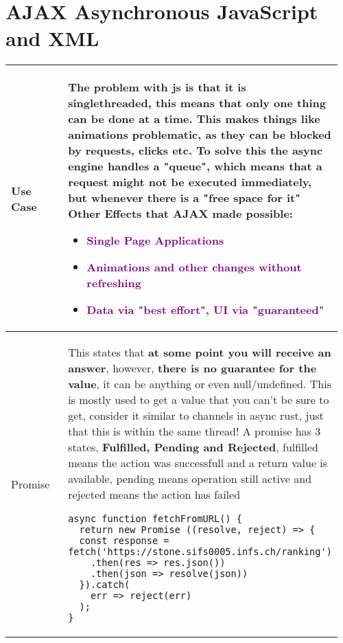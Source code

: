 \documentclass[main.tex,fontsize=8pt,paper=a4,paper=portrait,DIV=calc,]{scrartcl}
\begin{document}
\begin{table}[ht!]
\section{AJAX Asynchronous JavaScript and XML}
\begin{tabular}{|m{0.2\linewidth}|m{0.755\linewidth}|}
\hline
Use Case & 
The problem with js is that it is singlethreaded, this means that only one thing can be done at a time.\newline
This makes things like animations problematic, as they can be blocked by requests, clicks etc.\newline
To solve this the async engine handles a "queue", which means that a request might \textbf{not be executed immediately, but whenever there is a "free space for it"}\newline
Other Effects that AJAX made possible:\newline
\begin{itemize}
\item \textcolor{purple}{Single Page Applications}
\item \textcolor{purple}{Animations and other changes without refreshing}
\item \textcolor{purple}{Data via "best effort", UI via "guaranteed"}
\vspace{-3mm}
\end{itemize}\\ 
\hline
Promise & 
This states that \textbf{at some point you will receive an answer}, however, \textbf{there is no guarantee for the value}, it can be anything or even null/undefined.\newline
This is mostly used to get a value that you can't be sure to get, consider it similar to channels in async rust, just that this is within the same thread!\newline
\textcolor{OliveGreen}{A promise has 3 states, \textbf{Fulfilled, Pending and Rejected}, fulfilled means the action was successfull and a return value is available, pending means operation still active and rejected means the action has failed}\newline
\begin{lstlisting}
async function fetchFromURL() {
  return new Promise ((resolve, reject) => {
  const response = fetch('https://stone.sifs0005.infs.ch/ranking')
    .then(res => res.json())
    .then(json => resolve(json))
  }).catch(
    err => reject(err)
  );
}
\end{lstlisting}\\

\end{tabular}
\end{table}
\end{document}
